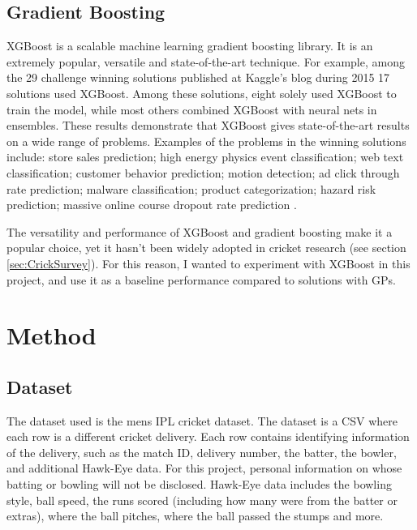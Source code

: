 \documentclass[12pt,a4paper]{report}
\theoremstyle{definition}
\begin{document}
\section{Gradient Boosting}

XGBoost is a scalable machine learning gradient boosting library.  
It is an extremely popular, versatile and state-of-the-art technique.
For example, among the 29 challenge winning solutions published at Kaggle’s blog during 2015 17 solutions used XGBoost.
Among these solutions, eight solely used XGBoost to train the model, while most others combined XGBoost with neural nets in ensembles.
These results demonstrate that XGBoost gives state-of-the-art results on a wide range of problems. 
Examples of the problems in the winning solutions include: store sales prediction; high energy physics event classification; web text classification; customer behavior prediction; motion detection; ad click through rate prediction; malware classification; product categorization; hazard risk prediction; massive online course dropout rate prediction \citep{Chen2016}.

The versatility and performance of XGBoost and gradient boosting make it a popular choice, yet it hasn't been widely adopted in cricket research (see section \ref{sec:CrickSurvey}).
For this reason, I wanted to experiment with XGBoost in this project, and use it as a baseline performance compared to solutions with GPs.

\chapter{Method} \label{chap:Method}

\section{Dataset} \label{sec:Dataset}

The dataset used is the mens IPL cricket dataset. 
The dataset is a CSV where each row is a different cricket delivery. 
Each row contains identifying information of the delivery, such as the match ID, delivery number, the batter, the bowler, and additional Hawk-Eye data.
For this project, personal information on whose batting or bowling will not be disclosed. 
Hawk-Eye data includes the bowling style, ball speed, the runs scored (including how many were from the batter or extras), where the ball pitches, where the ball passed the stumps and more.     
\end{document}
